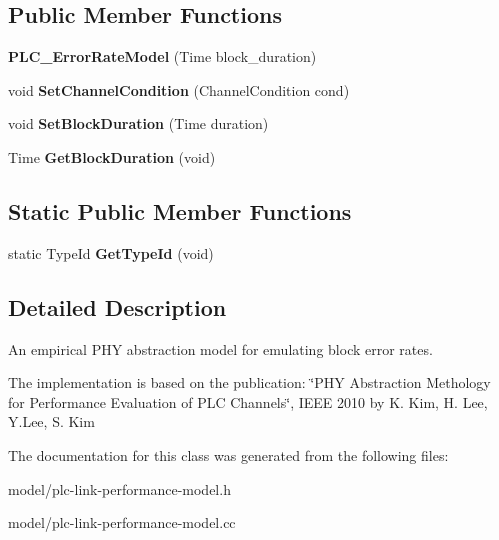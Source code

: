 \subsection*{\-Public \-Member \-Functions}
\begin{DoxyCompactItemize}
\item 
\hypertarget{classns3_1_1PLC__ErrorRateModel_a6daa76899816af728fe3bb6a6006a10f}{{\bfseries \-P\-L\-C\-\_\-\-Error\-Rate\-Model} (\-Time block\-\_\-duration)}\label{classns3_1_1PLC__ErrorRateModel_a6daa76899816af728fe3bb6a6006a10f}

\item 
\hypertarget{classns3_1_1PLC__ErrorRateModel_a4068e6be60a824441ab51663eb73ae8a}{void {\bfseries \-Set\-Channel\-Condition} (\-Channel\-Condition cond)}\label{classns3_1_1PLC__ErrorRateModel_a4068e6be60a824441ab51663eb73ae8a}

\item 
\hypertarget{classns3_1_1PLC__ErrorRateModel_ab96e29d66ba5c8dbd45c19b3730b1aeb}{void {\bfseries \-Set\-Block\-Duration} (\-Time duration)}\label{classns3_1_1PLC__ErrorRateModel_ab96e29d66ba5c8dbd45c19b3730b1aeb}

\item 
\hypertarget{classns3_1_1PLC__ErrorRateModel_abc04c11dbeb086f2e2c056cf657b28df}{\-Time {\bfseries \-Get\-Block\-Duration} (void)}\label{classns3_1_1PLC__ErrorRateModel_abc04c11dbeb086f2e2c056cf657b28df}

\end{DoxyCompactItemize}
\subsection*{\-Static \-Public \-Member \-Functions}
\begin{DoxyCompactItemize}
\item 
\hypertarget{classns3_1_1PLC__ErrorRateModel_af3398bec61b891d0ec93a3eae4aad540}{static \-Type\-Id {\bfseries \-Get\-Type\-Id} (void)}\label{classns3_1_1PLC__ErrorRateModel_af3398bec61b891d0ec93a3eae4aad540}

\end{DoxyCompactItemize}


\subsection{\-Detailed \-Description}
\-An empirical \-P\-H\-Y abstraction model for emulating block error rates. 

\-The implementation is based on the publication\-: \char`\"{}\-P\-H\-Y Abstraction Methology for Performance Evaluation of P\-L\-C Channels\char`\"{}, \-I\-E\-E\-E 2010 by \-K. \-Kim, \-H. \-Lee, \-Y.\-Lee, \-S. \-Kim 

\-The documentation for this class was generated from the following files\-:\begin{DoxyCompactItemize}
\item 
model/plc-\/link-\/performance-\/model.\-h\item 
model/plc-\/link-\/performance-\/model.\-cc\end{DoxyCompactItemize}
